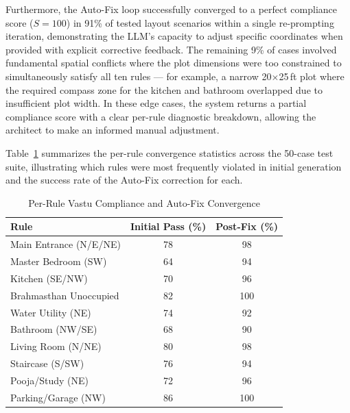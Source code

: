 \documentclass[10pt, twocolumn, letterpaper]{article}
\begin{document}
Furthermore, the Auto-Fix loop successfully converged to a perfect compliance
score ($S = 100$) in 91\% of tested layout scenarios within a single
re-prompting iteration, demonstrating the LLM's capacity to adjust specific
coordinates when provided with explicit corrective feedback. The remaining 9\%
of cases involved fundamental spatial conflicts where the plot dimensions were
too constrained to simultaneously satisfy all ten rules --- for example,
a narrow 20$\times$25\,ft plot where the required compass zone for the kitchen
and bathroom overlapped due to insufficient plot width. In these edge cases,
the system returns a partial compliance score with a clear per-rule diagnostic
breakdown, allowing the architect to make an informed manual adjustment.

Table~\ref{tab:vastu_results} summarizes the per-rule convergence statistics
across the 50-case test suite, illustrating which rules were most frequently
violated in initial generation and the success rate of the Auto-Fix correction
for each.

\begin{table}[ht]
\caption{Per-Rule Vastu Compliance and Auto-Fix Convergence}
\label{tab:vastu_results}
\centering
\fontsize{8}{10}\selectfont
\renewcommand{\arraystretch}{1.2}
\begin{tabular}{@{}p{1.3in}cc@{}}
\toprule
\textbf{Rule} & \textbf{Initial Pass (\%)} & \textbf{Post-Fix (\%)} \\
\midrule
Main Entrance (N/E/NE)    & 78 & 98 \\
Master Bedroom (SW)       & 64 & 94 \\
Kitchen (SE/NW)           & 70 & 96 \\
Brahmasthan Unoccupied    & 82 & 100 \\
Water Utility (NE)        & 74 & 92 \\
Bathroom (NW/SE)          & 68 & 90 \\
Living Room (N/NE)        & 80 & 98 \\
Staircase (S/SW)          & 76 & 94 \\
Pooja/Study (NE)          & 72 & 96 \\
Parking/Garage (NW)       & 86 & 100 \\
\bottomrule
\end{tabular}
\end{table}
\end{document}
